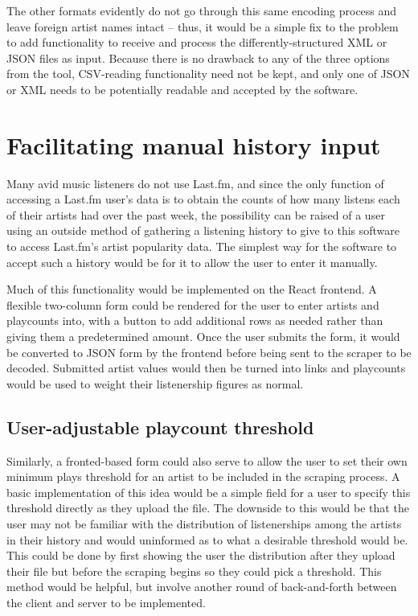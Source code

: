 The other formats evidently do not go through this same encoding process and leave foreign artist names intact -- thus, it would be a simple fix to the problem to add functionality to receive and process the differently-structured XML or JSON files as input. Because there is no drawback to any of the three options from the tool, CSV-reading functionality need not be kept, and only one of JSON or XML needs to be potentially readable and accepted by the software.

\section{Facilitating manual history input}\label{manualmode}

Many avid music listeners do not use Last.fm, and since the only function of accessing a Last.fm user's data is to obtain the counts of how many listens each of their artists had over the past week, the possibility can be raised of a user using an outside method of gathering a listening history to give to this software to access Last.fm's artist popularity data. The simplest way for the software to accept such a history would be for it to allow the user to enter it manually.

Much of this functionality would be implemented on the React frontend. A flexible two-column form could be rendered for the user to enter artists and playcounts into, with a button to add additional rows as needed rather than giving them a predetermined amount. Once the user submits the form, it would be converted to JSON form by the frontend before being sent to the scraper to be decoded. Submitted artist values would then be turned into links and playcounts would be used to weight their listenership figures as normal.

\subsection{User-adjustable playcount threshold}\label{fastmode}

Similarly, a fronted-based form could also serve to allow the user to set their own minimum plays threshold for an artist to be included in the scraping process. A basic implementation of this idea would be a simple field for a user to specify this threshold directly as they upload the file. The downside to this would be that the user may not be familiar with the distribution of listenerships among the artists in their history and would uninformed as to what a desirable threshold would be. This could be done by first showing the user the distribution after they upload their file but before the scraping begins so they could pick a threshold. This method would be helpful, but involve another round of back-and-forth between the client and server to be implemented.

